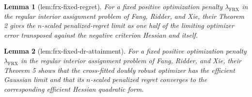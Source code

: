 \documentclass{article}
\newtheorem{lemma}{Lemma}
\begin{document}
\begin{lemma}[lem:frx-fixed-regret]\label{lem:frx-fixed-regret}
For a fixed positive optimization penalty \(\lambda_{\mathrm{FRX}}\) in the regular interior assignment problem of Fang, Ridder, and Xie, their Theorem 2 gives the \(n\)-scaled penalized-regret limit as one half of the limiting optimizer error transposed against the negative criterion Hessian and itself.
\end{lemma}

\begin{lemma}[lem:frx-fixed-dr-attainment]\label{lem:frx-fixed-dr-attainment}
For a fixed positive optimization penalty \(\lambda_{\mathrm{FRX}}\) in the regular interior assignment problem of Fang, Ridder, and Xie, their Theorem 5 shows that the cross-fitted doubly robust optimizer has the efficient Gaussian limit and that its \(n\)-scaled penalized regret converges to the corresponding efficient Hessian quadratic form.
\end{lemma}
\end{document}
